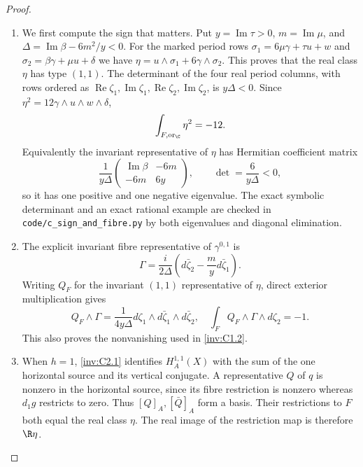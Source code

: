 \begin{proof}
\begin{enumerate}[label=\arabic*.,leftmargin=*]
\item We first compute the sign that matters.  Put
$y=\operatorname{Im}\tau>0$, $m=\operatorname{Im}\mu$, and
$\Delta=\operatorname{Im}\beta-6m^2/y<0$.
For the marked period rows
$\sigma_1=6\mu\gamma+\tau u+w$ and
$\sigma_2=\beta\gamma+\mu u+\delta$ we have
$\eta=u\wedge\sigma_1+6\gamma\wedge\sigma_2$.
This proves that the real class $\eta$ has type $(1,1)$.
The determinant of the four real period columns, with rows ordered
as $\operatorname{Re}\zeta_1,\operatorname{Im}\zeta_1,
\operatorname{Re}\zeta_2,\operatorname{Im}\zeta_2$, is
$y\Delta<0$.  Since $\eta^2=12\gamma\wedge u\wedge w\wedge\delta$,
\begin{equation}\label{inv:eq:C-eta-negative}
\int_{F,\mathrm{or}_{\C}}\eta^2=-12.
\end{equation}
Equivalently the invariant representative of $\eta$ has Hermitian
coefficient matrix
\[
\frac1{y\Delta}
\begin{pmatrix}\operatorname{Im}\beta&-6m\\-6m&6y\end{pmatrix},
\qquad \det=\frac6{y\Delta}<0,
\]
so it has one positive and one negative eigenvalue.  The exact
symbolic determinant and an exact rational example are checked in
\texttt{code/c\_sign\_and\_fibre.py} by both eigenvalues and
diagonal elimination.

\item The explicit invariant fibre representative of $\gamma^{0,1}$ is
\[
\Gamma=\frac{i}{2\Delta}
\left(d\bar\zeta_2-\frac myd\bar\zeta_1\right).
\]
Writing $Q_F$ for the invariant $(1,1)$ representative of $\eta$,
direct exterior multiplication gives
\[
Q_F\wedge\Gamma=
\frac1{4y\Delta}
d\zeta_1\wedge d\bar\zeta_1\wedge d\bar\zeta_2,
\quad
\int_FQ_F\wedge\Gamma\wedge d\zeta_2=-1.
\]
This also proves the nonvanishing used in \ref{inv:C1.2}.

\item When $h=1$, \ref{inv:C2.1} identifies $H_A^{1,1}(X)$ with the sum of the
one horizontal source and its vertical conjugate.  A representative
$Q$ of $q$ is nonzero in the horizontal source, since its fibre
restriction is nonzero whereas $d_1g$ restricts to zero.  Thus
$[Q]_A,[\bar Q]_A$ form a basis.  Their restrictions to $F$ both
equal the real class $\eta$.  The real image of the restriction map
is therefore $\R\eta$.


\end{enumerate}
\end{proof}
